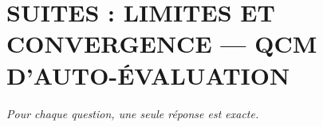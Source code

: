 
\section*{\textcolor{chapcolor}{\MakeUppercase{Suites : limites et convergence — QCM d'auto-évaluation}}}

\begin{center}
\textit{Pour chaque question, une seule réponse est exacte.}
\end{center}

